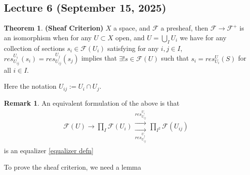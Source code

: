 \documentclass[10.5pt]{article}
\theoremstyle{definition}
\newtheorem{theorem}{Theorem}
\newtheorem{rmk}{Remark}
\begin{document}
    \subsection{Lecture 6 (September 15, 2025)}
    \begin{theorem}\textbf{(Sheaf Criterion)}
        \(X\) a space, and \(\mathcal{F}\) a presheaf, then \(\mathcal{F} \to \mathcal{F}^+\) is an isomorphism when for any \(U \subset X\) open, and \(U = \bigcup_I U_i\) we have for any collection of sections \(s_i \in \mathcal{F}(U_i)\) satisfying for any \(i,j \in I\), \(res^{U_i}_{U_{ij}}(s_i) = res^{U_j}_{U_{ij}}(s_j)\) implies that \(\exists ! s \in \mathcal{F}(U)\) such that \(s_i = res^U_{U_i}(S)\) for all \(i \in I\).

        Here the notation \(U_{ij} := U_i \cap U_j\).
    \end{theorem}
    \begin{rmk}
        An equivalent formulation of the above is that
        \begin{align*}
            \mathcal{F}(U) \to \prod_I \mathcal{F}(U_i) \substack{\overset{res^{U_i}_{U_{ij}}}{\longrightarrow} \\ \underset{res^{U_j}_{U_{ij}}}{\longrightarrow}} \prod_{I^2} \mathcal{F}(U_{ij})
        \end{align*}
        is an equalizer \ref{equalizer defn}
    \end{rmk}

    To prove the sheaf criterion, we need a lemma
\end{document}

